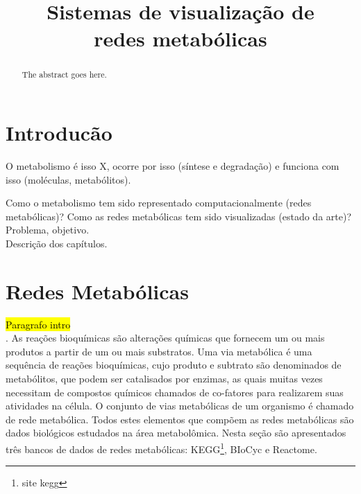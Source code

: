\documentclass[conference]{IEEEtran}
\begin{document}
\title{Sistemas de visualização de\\redes metabólicas}

\author{
}


\maketitle

\begin{abstract}
The abstract goes here.
\end{abstract}


\section{Introducão}

O metabolismo é isso X, ocorre por isso (síntese e degradação) e funciona com isso (moléculas, metabólitos).

Como o metabolismo tem sido representado computacionalmente (redes metabólicas)? Como as redes metabólicas tem sido visualizadas (estado da arte)? \\
Problema, objetivo. \\
Descrição dos capítulos.


\section{Redes Metabólicas}

\hl{Paragrafo intro} \\. As reações bioquímicas são alterações químicas que fornecem um ou mais produtos a partir de um ou mais substratos. Uma via metabólica é uma sequência de reações bioquímicas, cujo produto e subtrato são denominados de metabólitos, que podem ser catalisados por enzimas, as quais muitas vezes necessitam de compostos químicos chamados de co-fatores para realizarem suas atividades na célula. O conjunto de vias metabólicas de um organismo é chamado de rede metabólica. Todos estes elementos que compõem as redes metabólicas são dados biológicos estudados na área metabolômica. Nesta seção são apresentados três bancos de dados de redes metabólicas: KEGG\footnote{site kegg}, BIoCyc e Reactome.
\end{document}
